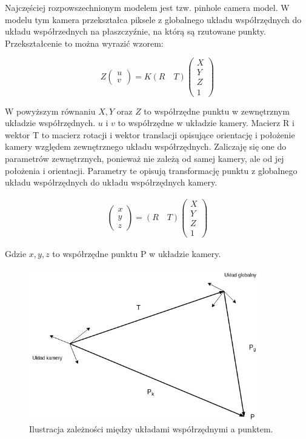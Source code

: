 \documentclass[oneside, eng]{mgr}
\begin{document}
Najczęściej rozpowszechnionym modelem jest tzw. pinhole camera model. W modelu tym kamera przekształca piksele z globalnego układu współrzędnych do układu współrzednych na płaszczyźnie, na którą są rzutowane punkty. Przekształcenie to można wyrazić wzorem:

\begin{equation}
	Z
	\left( \begin{array}{l}
		u \\
		v 
	\end{array} \right) 
	= K (R \quad T) 
	\left( \begin{array}{l}
		X \\	Y \\	Z \\	1
	\end{array} \right) 
\end{equation}

W powyższym równaniu $X, Y$ oraz $Z$ to współrzędne punktu w zewnętrznym układzie współrzędnych.
$u$ i $v$ to współrzędne w układzie kamery.
Macierz R i wektor T to macierz rotacji i wektor translacji opisujące orientację i położenie kamery względem zewnętrznego układu współrzędnych. Zaliczaję się one do parametrów zewnętrznych, ponieważ nie zależą od samej kamery, ale od jej położenia i orientacji. Parametry te opisują transformację punktu z globalnego układu współrzędnych do układu współrzędnych kamery. 

\begin{align*}
	\left( \begin{array}{l} x \\ y \\ z \end{array} \right) =
	(R \quad T)
	\left( \begin{array}{l}
		X \\	Y \\	Z \\	1
	\end{array} \right) 
\end{align*}

Gdzie $x, y, z$ to współrzędne punktu P w układzie kamery.


\begin{figure}
\centering
	\includegraphics[width=0.90\textwidth]{pinhole.jpg}\par\vspace{1cm}
\caption{Ilustracja zależności między układami współrzędnymi a punktem.}
	\label{fig:camera_coordinate_systems}
\end{figure}
\end{document}
